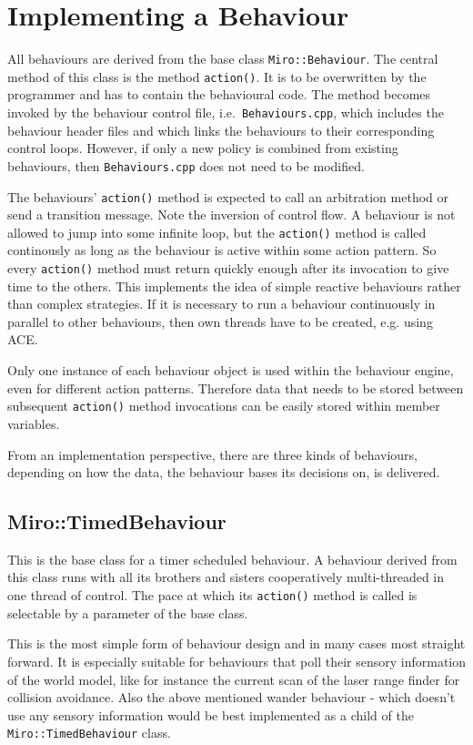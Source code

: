 \section{Implementing a Behaviour}

All behaviours are derived from the base class {\tt Miro::Behaviour}.
The central method of this class is the method {\tt action()}.
It is to be overwritten by the programmer
and has to contain the behavioural code.
The method becomes invoked by the behaviour control file,
i.e.\ {\tt Behaviours.cpp}, which includes the behaviour header files
and which links the behaviours to their corresponding control loops.
However, if only a new policy is combined from existing behaviours,
then {\tt Behaviours.cpp} does not need to be modified.

The behaviours' {\tt action()} method is expected to call an arbitration
method or send a transition message. Note the inversion of control flow.
A behaviour is not allowed to jump into some infinite loop,
but the {\tt action()} method is called continously
as long as the behaviour is active within some action pattern.
So every {\tt action()} method must return quickly enough after its
invocation to give time to the others. This implements the idea of
simple reactive behaviours rather than complex strategies.
If it is necessary to run a behaviour continuously in parallel to other
behaviours, then own threads have to be created, e.g. using ACE.

Only one instance of each behaviour object is used within the behaviour
engine, even for different action patterns.  Therefore data that needs
to be stored between subsequent {\tt action()} method invocations can
be easily stored within member variables.

From an implementation perspective, there are three kinds of
behaviours, depending on how the data, the behaviour bases its
decisions on, is delivered.

\subsection{Miro::TimedBehaviour}
\label{SEC:MIRO_TIMED_BEHAVIOUR}

This is the base class for a timer scheduled behaviour. A behaviour
derived from this class runs with all its brothers and sisters
cooperatively multi-threaded in one thread of control. The pace at
which its {\tt action()} method is called is selectable by a parameter of
the base class.

This is the most simple form of behaviour design and in many cases most
straight forward. It is especially suitable for behaviours that poll
their sensory information of the world model, like for instance the
current scan of the laser range finder for collision avoidance. Also
the above mentioned wander behaviour - which doesn't use any sensory
information would be best implemented as a child of the
{\tt Miro::TimedBehaviour} class.


